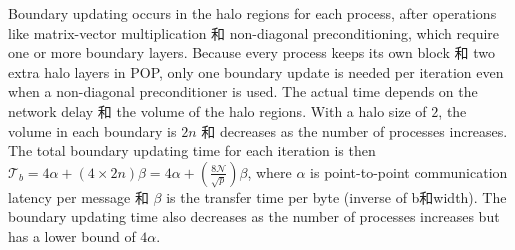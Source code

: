 Boundary updating occurs in the halo regions for each process, after
operations like matrix-vector multiplication 和 non-diagonal
preconditioning, which require one or more boundary layers.
Because every process keeps its own block 和 two extra
halo layers in POP,  only one boundary update is needed per
iteration even when a non-diagonal preconditioner is used.
The actual time depends on the network delay 和 the volume of the
halo regions.  With a halo size of $2$, the volume in each boundary
is $2n$ 和 decreases as the number of processes increases.
The total boundary updating time for each iteration is then $\mathcal{T}_b =4\alpha +(4\times 2n)\beta=4\alpha +(\frac{8\mathcal{N}}{\sqrt{p}})\beta $,
where $\alpha$ is point-to-point communication latency per message 和
$\beta$ is the transfer time per byte (inverse of b和width).
The boundary updating time also decreases as the number of processes increases but has a lower bound of $4\alpha$.


